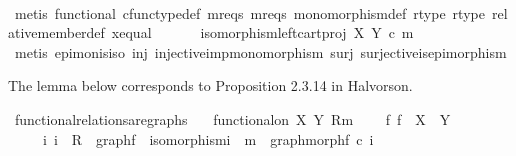 \begin{isabellebody}
\ \ \ \ \ \ \isamarkupfalse%
\ {\isacharparenleft}{\kern0pt}metis\ functional\ cfunc{\isacharunderscore}{\kern0pt}type{\isacharunderscore}{\kern0pt}def\ m{}r{}{\isacharunderscore}{\kern0pt}eqs\ m{}r{}{\isacharunderscore}{\kern0pt}eqs\ monomorphism{\isacharunderscore}{\kern0pt}def\ r{}{\isacharunderscore}{\kern0pt}type\ r{}{\isacharunderscore}{\kern0pt}type\ relative{\isacharunderscore}{\kern0pt}member{\isacharunderscore}{\kern0pt}def{}\ x{\isacharunderscore}{\kern0pt}equal{\isacharparenright}{\kern0pt}\isanewline
\ \ \isamarkupfalse%
\isanewline
\ \ \isamarkupfalse%
\ {\isachardoublequoteopen}isomorphism{\isacharparenleft}{\kern0pt}left{\isacharunderscore}{\kern0pt}cart{\isacharunderscore}{\kern0pt}proj\ X\ Y\ {\isasymcirc}\isactrlsub c\ m{\isacharparenright}{\kern0pt}{\isachardoublequoteclose}\isanewline
\ \ \ \ \isamarkupfalse%
\ {\isacharparenleft}{\kern0pt}metis\ epi{\isacharunderscore}{\kern0pt}mon{\isacharunderscore}{\kern0pt}is{\isacharunderscore}{\kern0pt}iso\ inj\ injective{\isacharunderscore}{\kern0pt}imp{\isacharunderscore}{\kern0pt}monomorphism\ surj\ surjective{\isacharunderscore}{\kern0pt}is{\isacharunderscore}{\kern0pt}epimorphism{\isacharparenright}{\kern0pt}\isanewline
{}\isamarkupfalse%
%
\endisatagproof
{\isafoldproof}%
%
\isadelimproof
%
\endisadelimproof
%
\begin{isamarkuptext}%
The lemma below corresponds to Proposition 2.3.14 in Halvorson.%
\end{isamarkuptext}\isamarkuptrue%
\isamarkupfalse%
\ functional{\isacharunderscore}{\kern0pt}relations{\isacharunderscore}{\kern0pt}are{\isacharunderscore}{\kern0pt}graphs{\isacharcolon}{\kern0pt}\isanewline
\ \ \ {\isachardoublequoteopen}functional{\isacharunderscore}{\kern0pt}on\ X\ Y\ {\isacharparenleft}{\kern0pt}R{\isacharcomma}{\kern0pt}m{\isacharparenright}{\kern0pt}{\isachardoublequoteclose}\isanewline
\ \ \ {\isachardoublequoteopen}{\isasymexists}{\isacharbang}{\kern0pt}\ f{\isachardot}{\kern0pt}\ f\ {\isacharcolon}{\kern0pt}\ X\ {\isasymrightarrow}\ Y\ {\isasymand}\ \isanewline
\ \ \ \ {\isacharparenleft}{\kern0pt}{\isasymexists}\ i{\isachardot}{\kern0pt}\ i\ {\isacharcolon}{\kern0pt}\ R\ {\isasymrightarrow}\ graph{\isacharparenleft}{\kern0pt}f{\isacharparenright}{\kern0pt}\ {\isasymand}\ isomorphism{\isacharparenleft}{\kern0pt}i{\isacharparenright}{\kern0pt}\ {\isasymand}\ m\ {\isacharequal}{\kern0pt}\ graph{\isacharunderscore}{\kern0pt}morph{\isacharparenleft}{\kern0pt}f{\isacharparenright}{\kern0pt}\ {\isasymcirc}\isactrlsub c\ i{\isacharparenright}{\kern0pt}{\isachardoublequoteclose}\isanewline

\end{isabellebody}
